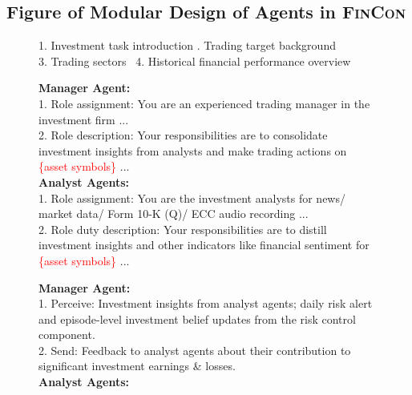 \newpage
\subsection{Figure of Modular Design of Agents in \textsc{FinCon}}
\label{detailed_modules}

\begin{figure}[ht]
\centering
\begin{tcbraster}[raster columns=1] 
    \begin{tcolorbox}[colback=white, colframe=lightblue, title=General Configuration, boxsep=2pt, top=2pt, bottom=2pt]
    1. Investment task introduction \quad {}. Trading target background \\
    3. Trading sectors \quad \quad \quad \quad \quad \quad \quad \quad \
    4. Historical financial performance overview
    \end{tcolorbox}
    \begin{tcolorbox}[colback=white, colframe=lightpurple, title=Profiling Module , boxsep=2pt, top=2pt, bottom=2pt]
    \raggedright
    \textbf{Manager Agent:}\\
    1. Role assignment: You are an experienced 
    trading manager in the investment firm ...\\
    2. Role description: Your responsibilities are to consolidate investment insights from analysts and make trading actions on  \textcolor{red}{\{asset symbols\}} ...\\
    \textbf{Analyst Agents:}\\
    1. Role assignment: You are the investment analysts for news/ market data/ Form 10-K (Q)/ ECC audio recording ...\\
    2. Role duty description: Your responsibilities are to distill 
   investment insights and other indicators like financial sentiment for  \textcolor{red}{\{asset symbols\}} ...
    \end{tcolorbox}
    \begin{tcolorbox}[colback=white, colframe=lightorange, title=Perception Module, boxsep=2pt, top=2pt, bottom=2pt]
    \raggedright
    \textbf{Manager Agent:}\\
    1. Perceive: Investment insights from analyst agents; daily risk alert and episode-level investment belief updates from the risk control component.\\
    2. Send: Feedback to analyst agents about their contribution to significant investment earnings \& losses.\\     
    \textbf{Analyst Agents:}\\

\end{tcolorbox}
\end{tcbraster}
\end{figure}
